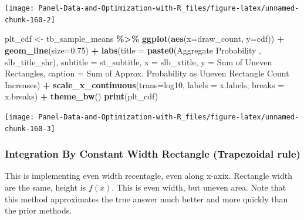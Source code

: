 \documentclass[
]{book}
\newenvironment{Shaded}{\begin{snugshade}}{\end{snugshade}}
\newcommand{\DataTypeTok}[1]{\textcolor[rgb]{0.13,0.29,0.53}{#1}}
\newcommand{\FloatTok}[1]{\textcolor[rgb]{0.00,0.00,0.81}{#1}}
\newcommand{\KeywordTok}[1]{\textcolor[rgb]{0.13,0.29,0.53}{\textbf{#1}}}
\newcommand{\NormalTok}[1]{#1}
\newcommand{\OperatorTok}[1]{\textcolor[rgb]{0.81,0.36,0.00}{\textbf{#1}}}
\newcommand{\StringTok}[1]{\textcolor[rgb]{0.31,0.60,0.02}{#1}}
\begin{document}
\begin{center}\texttt{[image: Panel-Data-and-Optimization-with-R\_files/figure-latex/unnamed-chunk-160-2]} \end{center}

\begin{Shaded}
\begin{Highlighting}[]
\NormalTok{plt\_cdf \textless{}{-}}\StringTok{ }\NormalTok{tb\_sample\_means }\OperatorTok{\%\textgreater{}\%}
\StringTok{  }\KeywordTok{ggplot}\NormalTok{(}\KeywordTok{aes}\NormalTok{(}\DataTypeTok{x=}\NormalTok{draw\_count, }\DataTypeTok{y=}\NormalTok{cdf)) }\OperatorTok{+}
\StringTok{  }\KeywordTok{geom\_line}\NormalTok{(}\DataTypeTok{size=}\FloatTok{0.75}\NormalTok{) }\OperatorTok{+}
\StringTok{  }\KeywordTok{labs}\NormalTok{(}\DataTypeTok{title =} \KeywordTok{paste0}\NormalTok{(}\StringTok{\textquotesingle{}Aggregate Probability \textquotesingle{}}\NormalTok{, slb\_title\_shr),}
       \DataTypeTok{subtitle =}\NormalTok{ st\_subtitle,}
       \DataTypeTok{x =}\NormalTok{ slb\_xtitle,}
       \DataTypeTok{y =} \StringTok{\textquotesingle{}Sum of Uneven Rectangles\textquotesingle{}}\NormalTok{,}
       \DataTypeTok{caption =} \StringTok{\textquotesingle{}Sum of Approx. Probability as Uneven Rectangle Count Increases\textquotesingle{}}\NormalTok{) }\OperatorTok{+}
\StringTok{  }\KeywordTok{scale\_x\_continuous}\NormalTok{(}\DataTypeTok{trans=}\StringTok{\textquotesingle{}log10\textquotesingle{}}\NormalTok{, }\DataTypeTok{labels =}\NormalTok{ x.labels, }\DataTypeTok{breaks =}\NormalTok{ x.breaks) }\OperatorTok{+}
\StringTok{  }\KeywordTok{theme\_bw}\NormalTok{()}
\KeywordTok{print}\NormalTok{(plt\_cdf)}
\end{Highlighting}
\end{Shaded}

\begin{center}\texttt{[image: Panel-Data-and-Optimization-with-R\_files/figure-latex/unnamed-chunk-160-3]} \end{center}

\hypertarget{integration-by-constant-width-rectangle-trapezoidal-rule}{%
\subsubsection{Integration By Constant Width Rectangle (Trapezoidal rule)}\label{integration-by-constant-width-rectangle-trapezoidal-rule}}

This is implementing even width recentagle, even along x-axix. Rectangle width are the same, height is \(f(x)\). This is even width, but uneven area. Note that this method approximates the true answer much better and more quickly than the prior methods.
\end{document}
